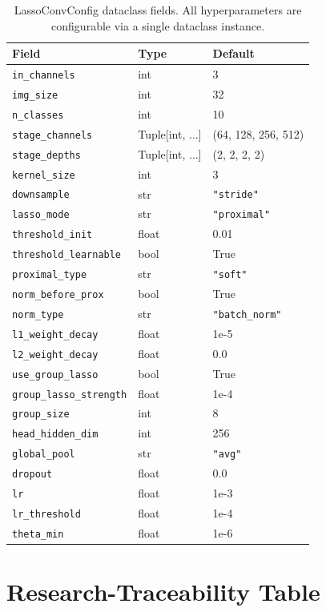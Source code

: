 \documentclass{article}
\begin{document}
\begin{table}[h]
\centering
\caption{LassoConvConfig dataclass fields. All hyperparameters are configurable
         via a single dataclass instance.}\label{tab:config}
\small
\begin{tabular}{lll}
\toprule
Field & Type & Default \\
\midrule
\texttt{in\_channels} & int & 3 \\
\texttt{img\_size} & int & 32 \\
\texttt{n\_classes} & int & 10 \\
\texttt{stage\_channels} & Tuple[int, ...] & (64, 128, 256, 512) \\
\texttt{stage\_depths} & Tuple[int, ...] & (2, 2, 2, 2) \\
\texttt{kernel\_size} & int & 3 \\
\texttt{downsample} & str & \texttt{"stride"} \\
\texttt{lasso\_mode} & str & \texttt{"proximal"} \\
\texttt{threshold\_init} & float & 0.01 \\
\texttt{threshold\_learnable} & bool & True \\
\texttt{proximal\_type} & str & \texttt{"soft"} \\
\texttt{norm\_before\_prox} & bool & True \\
\texttt{norm\_type} & str & \texttt{"batch\_norm"} \\
\texttt{l1\_weight\_decay} & float & 1e-5 \\
\texttt{l2\_weight\_decay} & float & 0.0 \\
\texttt{use\_group\_lasso} & bool & True \\
\texttt{group\_lasso\_strength} & float & 1e-4 \\
\texttt{group\_size} & int & 8 \\
\texttt{head\_hidden\_dim} & int & 256 \\
\texttt{global\_pool} & str & \texttt{"avg"} \\
\texttt{dropout} & float & 0.0 \\
\texttt{lr} & float & 1e-3 \\
\texttt{lr\_threshold} & float & 1e-4 \\
\texttt{theta\_min} & float & 1e-6 \\
\bottomrule
\end{tabular}
\end{table}

\section{Research-Traceability Table}
\end{document}
